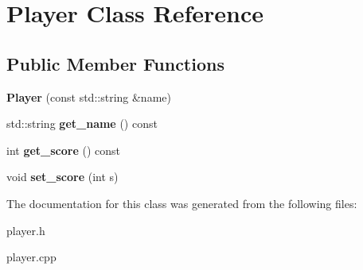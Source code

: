 \hypertarget{class_player}{
\section{Player Class Reference}
\label{class_player}
}
\subsection*{Public Member Functions}
\begin{DoxyCompactItemize}
\item 
\hypertarget{class_player_a45fa04a2a4ff9235e6c100b7c6ab232a}{
{\bfseries Player} (const std::string \&name)}
\label{class_player_a45fa04a2a4ff9235e6c100b7c6ab232a}

\item 
\hypertarget{class_player_af0e9b880362d316aaf8c916f9ee54729}{
std::string {\bfseries get\_\-name} () const }
\label{class_player_af0e9b880362d316aaf8c916f9ee54729}

\item 
\hypertarget{class_player_a6392078e4f391f894c250eb00490a972}{
int {\bfseries get\_\-score} () const }
\label{class_player_a6392078e4f391f894c250eb00490a972}

\item 
\hypertarget{class_player_a69270699c8c981d5b4548e0bf8cdacfa}{
void {\bfseries set\_\-score} (int s)}
\label{class_player_a69270699c8c981d5b4548e0bf8cdacfa}

\end{DoxyCompactItemize}


The documentation for this class was generated from the following files:\begin{DoxyCompactItemize}
\item 
player.h\item 
player.cpp\end{DoxyCompactItemize}
